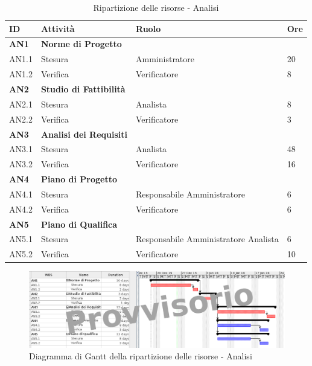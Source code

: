 \documentclass[12pt,a4paper]{article}
\begin{document}
\begin{table}[H]
\begin{center}
\begin{tabular}{p{} p{} p{} p{}}
\toprule
\textbf{ID}	&	\textbf{Attività}	&	\textbf{Ruolo}	&	\textbf{Ore}\\
\midrule
\midrule
\textbf{AN1} & \textbf{Norme di Progetto} &  &  \\
\midrule
AN1.1 & Stesura & Amministratore & 20 \\
\midrule
AN1.2 & Verifica & Verificatore & 8 \\
\midrule
\textbf{AN2} & \textbf{Studio di Fattibilità} & & \\
\midrule
AN2.1 & Stesura & Analista & 8 \\
\midrule
AN2.2 & Verifica & Verificatore & 3 \\
\midrule
\textbf{AN3} & \textbf{Analisi dei Requisiti} & &  \\
\midrule
AN3.1 & Stesura & Analista & 48 \\
\midrule
AN3.2 & Verifica & Verificatore & 16 \\
\midrule
\textbf{AN4} & \textbf{Piano di Progetto} & &  \\
\midrule
AN4.1 & Stesura & Responsabile \newline Amministratore & 6 \newline 12 \\
\midrule
AN4.2 & Verifica & Verificatore & 6 \\
\midrule
\textbf{AN5} & \textbf{Piano di Qualifica} & & \\
\midrule
AN5.1 & Stesura & Responsabile \newline Amministratore \newline Analista & 6 \newline 8 \newline 10 \\
\midrule
AN5.2 & Verifica & Verificatore & 10 \\
\bottomrule
\end{tabular}
\caption{Ripartizione delle risorse - Analisi}
\end{center}
\end{table}

\begin{center}
\begin{figure}[H]
\centering
\includegraphics[width=\textwidth]{diagrammaGanttAnalisi.png}
\caption{Diagramma di Gantt della ripartizione delle risorse - Analisi}
\end{figure}
\end{center}
\end{document}
